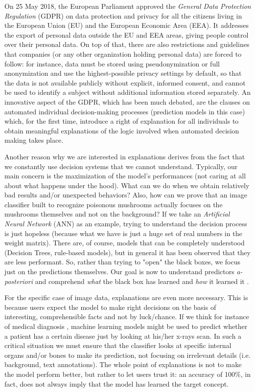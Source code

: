 \documentclass[12pt, twoside, a4paper]{report}
\begin{document}
On 25 May 2018, the European Parliament approved the \textit{General Data Protection Regulation} (GDPR) on data protection and privacy for all the citizens living in the European Union (EU) and the European Economic Area (EEA). It addresses the export of personal data outside the EU and EEA areas, giving people control over their personal data. On top of that, there are also restrictions and guidelines that companies (or any other organization holding personal data) are forced to follow: for instance, data must be stored using pseudonymization or full anonymization and use the highest-possible privacy settings by default, so that the data is not available publicly without explicit, informed consent, and cannot be used to identify a subject without additional information stored separately.
An innovative aspect of the GDPR, which has been much debated, are the clauses on automated individual decision-making processes (prediction models in this case) which, for the first time, introduce a right of explanation for all individuals to obtain meaningful explanations of the logic involved when automated decision making takes place.

Another reason why we are interested in explanations derives from the fact that we constantly use decision systems that we cannot understand. Typically, our main concern is the maximization of the model's performances (not caring at all about what happens under the hood). What can we do when we obtain relatively bad results and/or unexpected behaviors? Also, how can we prove that an image classifier built to recognize poisonous mushrooms actually focuses on the mushrooms themselves and not on the background?
If we take an \textit{Artificial Neural Network} (ANN) as an example, trying to understand the decision process is just hopeless (because what we have is just a huge set of real numbers in the weight matrix). 
There are, of course, models that can be completely understood (Decision Trees, rule-based models), but in general it has been observed that they are less performant. So, rather than trying to "open" the black boxes, we focus just on the predictions themselves. Our goal is now to understand predictors \textit{a-posteriori} and comprehend \textit{what} the black box has learned and \textit{how} it learned it \cite{fong}.

For the specific case of image data, explanations are even more necessary. This is because users expect the model to make right decisions on the basis of interesting, comprehensible facts and not by luck/chance. If we think for instance of medical diagnosis \cite{healthcare}, machine learning models might be used to predict whether a patient has a certain disease just by looking at his/her x-rays scan. In such a critical situation we must ensure that the classifier looks at specific internal organs and/or bones to make its prediction, not focusing on irrelevant details (i.e. background, text annotations). 
The whole point of explanations is not to make the model perform better, but rather to let users trust it: an accuracy of 100\%, in fact, does not always imply that the model has learned the target concept.
\end{document}

